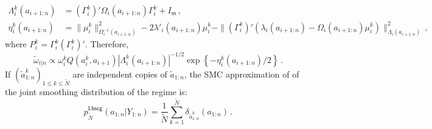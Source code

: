 \documentclass[nolayout]{article}
\theoremstyle{plain}
\theoremstyle{definition}
\newcommand{\1}{\mathbbm{1}}
\def\dimz{\mathsf{m}}
\def\eqsp{\,}
\begin{document}
\begin{align*}
\Lambda^k_i(a_{i+1:n})&= (\Gamma_i^k)'\Omega_i(a_{i+1:n})\Gamma_i^k + I_{\dimz}\eqsp,\\
\eta^k_i(a_{i+1:n}) &= \|\mu_i^k\|^2_{\Omega^{-1}_i(a_{i+1:n})} - 2\lambda'_i(a_{i+1:n})\mu_i^k-\|(\Gamma_i^k)'(\lambda_i(a_{i+1:n})-\Omega_i(a_{i+1:n})\mu_i^k)\|^2_{\Lambda_i(a_{i+1:n})}\eqsp,
\end{align*}
where $P_i^k = \Gamma_i^k(\Gamma_i^k)'$. Therefore,
\[
\tilde{\omega}_{i|n} \propto \omega_i^kQ(a_i^k,a_{i+1})|\Lambda^k_i(a_{i+1:n})|^{-1/2}\exp\left\{-\eta^k_i(a_{i+1:n})/2\right\}\eqsp.
\]
If $(\tilde{a}^k_{1:n})_{1\le k \le \tilde{N}}$ are independent copies of $\tilde{a}_{1:n}$, the SMC approximation of \cite{lindsten:bunch:sarkka:schon:godsill:2015} of the joint smoothing distribution of the regime is:
\[
p^{\mathsf{Lbscg}}_{\tilde{N}}(a_{1:n}|Y_{1:n}) = \frac{1}{\tilde{N}}\sum_{k=1}^{\tilde N} \delta_{\tilde{a}^{k}_{1:n}}(a_{1:n})\eqsp.
\]
\end{document}
